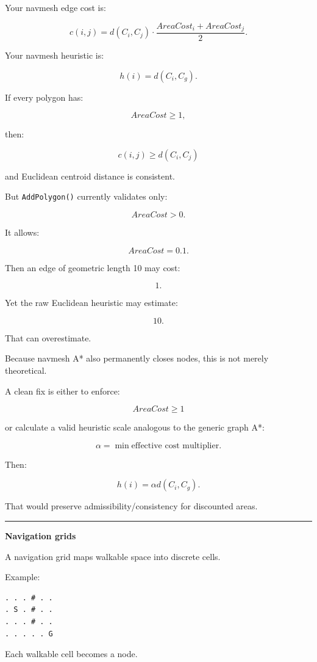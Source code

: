 Your navmesh edge cost is:

\[
c(i,j)
=
d(C_i,C_j)
\cdot
\frac{
AreaCost_i+AreaCost_j
}{2}.
\]

Your navmesh heuristic is:

\[
h(i)
=
d(C_i,C_g).
\]

If every polygon has:

\[
AreaCost\ge1,
\]

then:

\[
c(i,j)\ge d(C_i,C_j)
\]

and Euclidean centroid distance is consistent.

But \texttt{AddPolygon()} currently validates only:

\[
AreaCost>0.
\]

It allows:

\[
AreaCost=0.1.
\]

Then an edge of geometric length 10 may cost:

\[
1.
\]

Yet the raw Euclidean heuristic may estimate:

\[
10.
\]

That can overestimate.

Because navmesh A* also permanently closes nodes, this is not merely theoretical.

A clean fix is either to enforce:

\[
AreaCost\ge1
\]

or calculate a valid heuristic scale analogous to the generic graph A*:

\[
\alpha
=
\min
\text{effective cost multiplier}.
\]

Then:

\[
h(i)
=
\alpha d(C_i,C_g).
\]

That would preserve admissibility/consistency for discounted areas.

\begin{center}\rule{0.5\linewidth}{0.5pt}\end{center}

\textbf{Navigation grids}

A navigation grid maps walkable space into discrete cells.

Example:

\begin{verbatim}
. . . # . .
. S . # . .
. . . # . .
. . . . . G
\end{verbatim}

Each walkable cell becomes a node.

